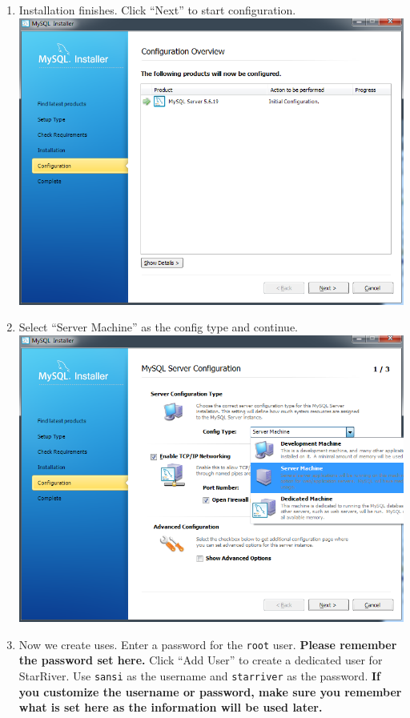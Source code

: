 \begin{enumerate}
\item
  Installation finishes. Click ``Next'' to start configuration.
  \includegraphics{img/mysql_6.png}
\item
  Select ``Server Machine'' as the config type and continue.
  \includegraphics{img/mysql_7.png}
\item
  Now we create uses. Enter a password for the \texttt{root} user.
  \textbf{Please remember the password set here.} Click ``Add User'' to
  create a dedicated user for StarRiver. Use \texttt{sansi} as the
  username and \texttt{starriver} as the password. \textbf{If you
  customize the username or password, make sure you remember what is set
  here as the information will be used later.}

\end{enumerate}
